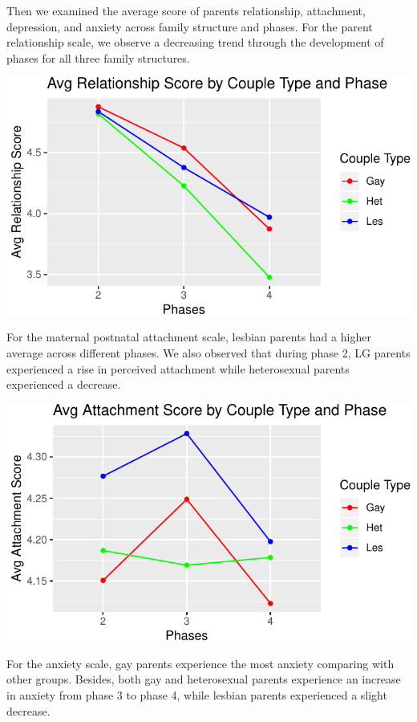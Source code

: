 \documentclass[man]{apa6}
\begin{document}
Then we examined the average score of parents relationship, attachment, depression, and anxiety across family structure and phases. For the parent relationship scale, we observe a decreasing trend through the development of phases for all three family structures.

\includegraphics{final_paper_files/figure-latex/fig1-1.pdf}

For the maternal postnatal attachment scale, lesbian parents had a higher average across different phases. We also observed that during phase 2, LG parents experienced a rise in perceived attachment while heterosexual parents experienced a decrease.

\includegraphics{final_paper_files/figure-latex/fig2-1.pdf}

For the anxiety scale, gay parents experience the most anxiety comparing with other groups. Besides, both gay and heterosexual parents experience an increase in anxiety from phase 3 to phase 4, while lesbian parents experienced a slight decrease.
\end{document}
